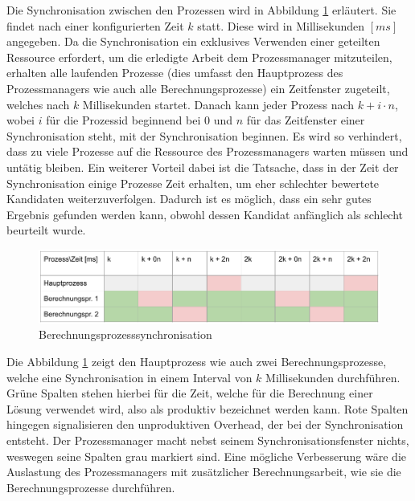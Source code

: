 Die Synchronisation zwischen den Prozessen wird in Abbildung \ref{fig:berechnungsprozess_synchronisation} erläutert.
Sie findet nach einer konfigurierten Zeit $k$ statt. Diese wird in Millisekunden $[ms]$
angegeben. Da die Synchronisation ein exklusives Verwenden einer geteilten Ressource erfordert, um die erledigte Arbeit
dem Prozessmanager mitzuteilen, erhalten alle laufenden Prozesse (dies umfasst den Hauptprozess des Prozessmanagers wie auch
alle Berechnungsprozesse) ein Zeitfenster zugeteilt, welches nach $k$ Millisekunden startet. Danach kann jeder Prozess nach
$k + i \cdot n$, wobei $i$ für die Prozessid beginnend bei $0$ und $n$ für das Zeitfenster einer Synchronisation steht,
mit der Synchronisation beginnen. Es wird so verhindert, dass zu viele Prozesse auf die Ressource des Prozessmanagers
warten müssen und untätig bleiben. Ein weiterer Vorteil dabei ist die Tatsache, dass in der Zeit der Synchronisation
einige Prozesse Zeit erhalten, um eher schlechter bewertete Kandidaten weiterzuverfolgen. Dadurch ist es möglich,
dass ein sehr gutes Ergebnis gefunden werden kann, obwohl dessen Kandidat anfänglich als schlecht beurteilt wurde.

\begin{figure}[h!]
    \begin{center}
        \includegraphics[width=0.8\linewidth]{../common/03_billiard_ai/resources/15_berechnungsprozess_synchronisation.png}
    \end{center}
    \caption{Berechnungsprozesssynchronisation}
    \label{fig:berechnungsprozess_synchronisation}
\end{figure}

Die Abbildung \ref{fig:berechnungsprozess_synchronisation} zeigt den Hauptprozess wie auch zwei Berechnungsprozesse, welche
eine Synchronisation in einem Interval von $k$ Millisekunden durchführen. Grüne Spalten stehen hierbei für die Zeit, welche für die Berechnung
einer Lösung verwendet wird, also als produktiv bezeichnet werden kann. Rote Spalten hingegen signalisieren den unproduktiven
Overhead, der bei der Synchronisation entsteht. Der Prozessmanager macht nebst seinem Synchronisationsfenster nichts,
weswegen seine Spalten grau markiert sind. Eine mögliche Verbesserung wäre die Auslastung des Prozessmanagers mit zusätzlicher
Berechnungsarbeit, wie sie die Berechnungsprozesse durchführen.
